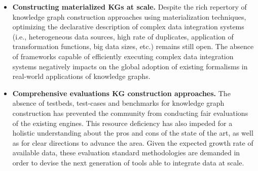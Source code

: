 \begin{itemize}
    \item \textbf{Constructing materialized KGs at scale.} Despite the rich repertory of knowledge graph construction approaches using materialization techniques, optimizing the declarative description of complex data integration systems (i.e., heterogeneous data sources, high rate of duplicates, application of transformation functions, big data sizes, etc.) remains still open. The absence of frameworks capable of efficiently executing complex data integration systems negatively impacts on the global adoption of existing formalisms in real-world applications of knowledge graphs.
    \item \textbf{Comprehensive evaluations KG construction approaches.} The absence of testbeds, test-cases and benchmarks for knowledge graph construction has prevented the community from conducting fair evaluations of the existing engines. This resource deficiency has also impeded for a holistic understanding about the pros and cons of the state of the art, as well as for clear directions to advance the area. Given the expected growth rate of available data, these evaluation standard methodologies are demanded in order to devise the next generation of tools able to integrate data at scale.
\end{itemize}